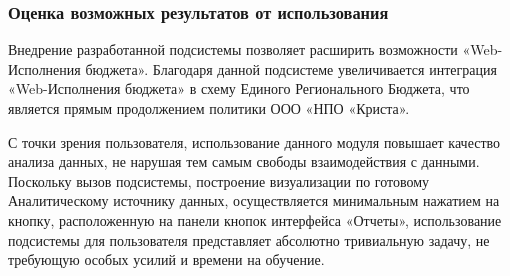 \documentclass[a4paper]{extarticle}
\begin{document}
\subsubsection{Оценка возможных результатов от использования}
Внедрение разработанной подсистемы позволяет расширить возможности «Web-Исполнения бюджета». Благодаря данной подсистеме увеличивается интеграция «Web-Исполнения бюджета» в схему Единого Регионального Бюджета, что является прямым продолжением политики ООО «НПО «Криста».\par
С точки зрения пользователя, использование данного модуля повышает качество анализа данных, не нарушая тем самым свободы взаимодействия с данными. Поскольку вызов подсистемы, построение визуализации по готовому Аналитическому источнику данных, осуществляется минимальным нажатием на кнопку, расположенную на панели кнопок интерфейса «Отчеты», использование подсистемы для пользователя представляет абсолютно тривиальную задачу, не требующую особых усилий и времени на обучение.
\end{document}
